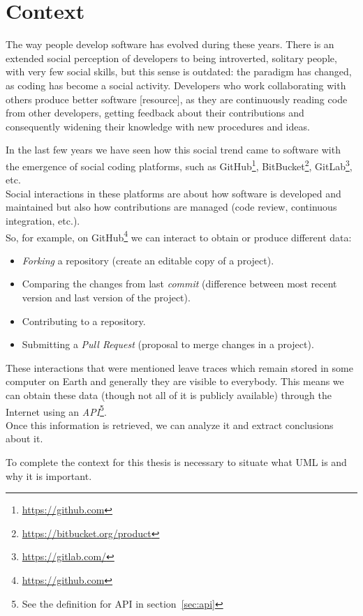 \documentclass[a4paper, 12pt]{book}
\begin{document}
\section{Context}
\label{sec:context}
The way people develop software has evolved during these years. There is an extended social perception of developers to
being introverted, solitary people, with very few social skills, but this sense is outdated: the paradigm has changed,
as coding has become a social activity. Developers who work collaborating with others produce better software [resource], as they
are continuously reading code from other developers, getting feedback about their contributions and consequently
widening their knowledge with new procedures and ideas.\par
In the last few years we have seen how this social trend came to software with the
emergence of social coding platforms, such as GitHub\footnote{\url{https://github.com}},
BitBucket\footnote{\url{https://bitbucket.org/product}}, GitLab\footnote{\url{https://gitlab.com/}}, etc.\\
Social interactions in these platforms are about how software is developed and maintained but also how
contributions are managed (code review, continuous integration, etc.).\\
So, for example, on GitHub\footnote{\url{https://github.com}} we can interact to obtain or produce different data:
\begin{itemize}
    \item \textit{Forking} a repository (create an editable copy of a project).
    \item Comparing the changes from last \textit{commit} (difference between most recent version and last version of the project).
    \item Contributing to a repository.
    \item Submitting a \textit{Pull Request} (proposal to merge changes in a project).
\end{itemize}
These interactions that were mentioned leave traces which remain stored in some computer on Earth and generally
they are visible to everybody.
This means we can obtain these data (though not all of it is publicly available) through the Internet using an
\emph{API}\footnote{See the definition for API in section~\ref{sec:api}}.\\
Once this information is retrieved, we can analyze it and extract conclusions about it.\par
To complete the context for this thesis is necessary to situate what UML is and why it is important.
\end{document}
